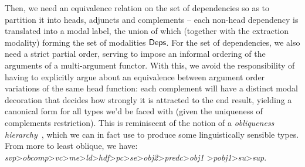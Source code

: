 Then, we need an equivalence relation on the set of dependencies so as to partition it into heads, adjuncts and complements -- each non-head dependency is translated into a modal label, the union of which (together with the extraction modality) forming the set of modalities $\mathsf{Deps}$.
For the set of dependencies, we also need a strict partial order, serving to impose an informal ordering of the arguments of a multi-argument functor.
With this, we avoid the responsibility of having to explicitly argue about an equivalence between argument order variations of the same head function: each complement will have a distinct modal decoration that decides how strongly it is attracted to the end result, yielding a canonical form for all types we'd be faced with (given the uniqueness of complements restriction).
This is reminiscent of the notion of a \textit{obliqueness hierarchy}~\cite{dowty1982grammatical}, which we can in fact use to produce some linguistically sensible types.
From more to least oblique, we have: \textit{svp}\textgreater\textit{obcomp}\textgreater\textit{vc}\textgreater\textit{me}\textgreater\textit{ld}\textgreater\textit{hdf}\textgreater\textit{pc}\textgreater\textit{se}\textgreater\textit{obj2}\textgreater\textit{predc}\textgreater\textit{obj1} \textgreater\textit{pobj1}\textgreater\textit{su}\textgreater\textit{sup}.

